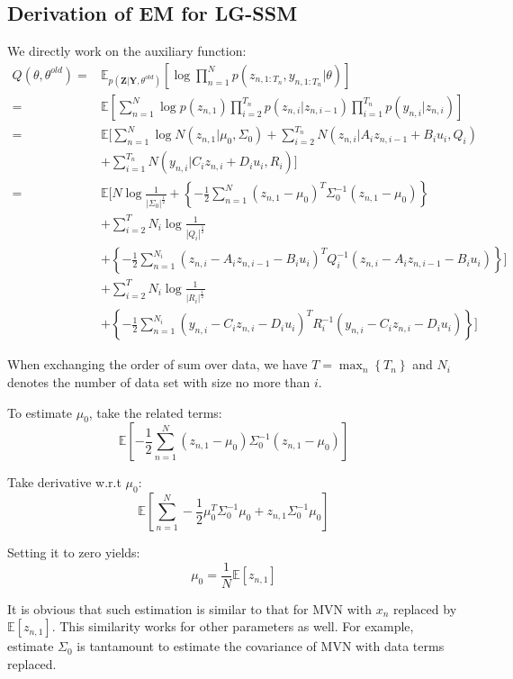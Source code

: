 \documentclass[UTF8]{ctexart}
\begin{document}
\subsection{Derivation of EM for LG-SSM}
We directly work on the auxiliary function:
\begin{align}
Q(\theta,\theta^{old})=&\mathbb{E}_{p(\textbf{Z}|\textbf{Y},\theta^{old})}[\log \prod_{n=1}^{N}p(z_{n,1:T_{n}},y_{n,1:T_{n}}|\theta)]\nonumber \\
=&\mathbb{E}[\sum_{n=1}^{N}\log p(z_{n,1})\prod_{i=2}^{T_{n}}p(z_{n,i}|z_{n,i-1})\prod_{i=1}^{T_{n}}p(y_{n,i}|z_{n,i})]\nonumber \\
=&\mathbb{E}[\sum_{n=1}^{N}\log N(z_{n,1}|\mu_{0},\Sigma_{0})+\sum_{i=2}^{T_{n}}N(z_{n,i}|A_{i}z_{n,i-1}+B_{i}u_{i},Q_{i}) \nonumber \\
\ &+\sum_{i=1}^{T_{n}}N(y_{n,i}|C_{i}z_{n,i}+D_{i}u_{i},R_{i})]\nonumber \\
=&\mathbb{E}[N\log\frac{1}{|\Sigma_{0}|^{\frac{1}{2}}}+\left\{-\frac{1}{2}\sum_{n=1}^{N}(z_{n,1}-\mu_{0})^{T}\Sigma_{0}^{-1}(z_{n,1}-\mu_{0}) \right\} \nonumber \\
\ &+\sum_{i=2}^{T}N_{i}\log\frac{1}{|Q_{i}|^{\frac{1}{2}}}\nonumber \\
\ &+\left\{-\frac{1}{2}\sum_{n=1}^{N_{i}}(z_{n,i}-A_{i}z_{n,i-1}-B_{i}u_{i})^{T}Q_{i}^{-1} (z_{n,i}-A_{i}z_{n,i-1}-B_{i}u_{i}) \right\}   ]\nonumber \\
\ &+\sum_{i=2}^{T}N_{i}\log\frac{1}{|R_{i}|^{\frac{1}{2}}}\nonumber \\
\ &+\left\{-\frac{1}{2}\sum_{n=1}^{N_{i}}(y_{n,i}-C_{i}z_{n,i}-D_{i}u_{i})^{T}R_{i}^{-1} (y_{n,i}-C_{i}z_{n,i}-D_{i}u_{i})\right\}   ]\nonumber
\end{align}

When exchanging the order of sum over data, we have $T=\max_{n}\left\{T_{n} \right\}$ and $N_{i}$ denotes the number of data set with size no more than $i$.

To estimate $\mu_{0}$, take the related terms:
$$\mathbb{E}[-\frac{1}{2}\sum_{n=1}^{N}(z_{n,1}-\mu_{0})\Sigma_{0}^{-1}(z_{n,1}-\mu_{0})]$$

Take derivative w.r.t $\mu_{0}$:
$$\mathbb{E}[\sum_{n=1}^{N}-\frac{1}{2}\mu_{0}^{T}\Sigma_{0}^{-1}\mu_{0}+z_{n,1}\Sigma^{-1}_{0}\mu_{0}]$$

Setting it to zero yields:
$$\mu_{0}=\frac{1}{N}\mathbb{E}[z_{n,1}]$$

It is obvious that such estimation is similar to that for MVN with $x_{n}$ replaced by $\mathbb{E}[z_{n,1}]$. This similarity works for other parameters as well. For example, estimate $\Sigma_{0}$ is tantamount to estimate the covariance of MVN with data terms replaced.
\end{document}
